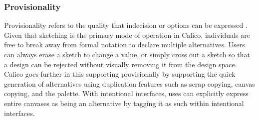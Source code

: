 
\subsubsection{Provisionality}
Provisionality refers to the quality that indecision or options can be expressed \cite{Petre2013BookChapter}. Given that sketching is the primary mode of operation in Calico, individuals are free to break away from formal notation to declare multiple alternatives. Users can always erase a sketch to change a value, or simply cross out a sketch so that a design can be rejected without visually removing it from the design space. Calico goes further in this supporting provisionally by supporting the quick generation of alternatives using duplication features such as scrap copying, canvas copying, and the palette. With intentional interfaces, uses can explicitly express entire canvases as being an alternative by tagging it as such within intentional interfaces.

 

